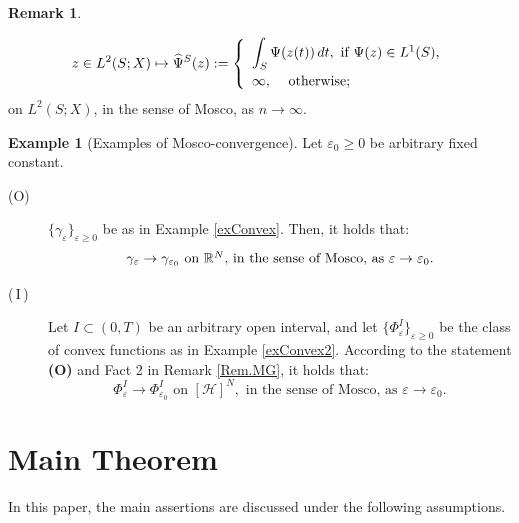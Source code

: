 \documentclass{sinst}
\numberwithin{equation}{section}
\theoremstyle{plain}
\theoremstyle{definition}
\newtheorem{rem}{Remark}
\newtheorem{ex}{Example}
\def\R{\mathbb{R}}
\def\sH{\mathscr{H}}
\def\ds{\displaystyle}
\begin{document}
\begin{rem}
\begin{description}
          \begin{equation*}
              z \in L^2(S; X) \mapsto \widehat{\Psi}^S(z) := \left\{ \begin{array}{ll}
                      \multicolumn{2}{l}{\ds \int_S \Psi(z(t)) \, dt, \mbox{ if $ \Psi(z) \in L^1(S) $,}}
                      \\[2ex]
                      \infty, & \mbox{ otherwise;}
                  \end{array} \right. 
          \end{equation*}
          on $ L^2(S; X) $, in the sense of Mosco, as $ n \to \infty $. 
  \end{description}
  \end{rem}
  
  \begin{ex}[Examples of Mosco-convergence]\label{Rem.ExMG}
      Let $ \varepsilon_0 \geq 0 $ be arbitrary fixed constant.
      \begin{description}
        \item[(O)] $\{ \gamma_\varepsilon \}_{\varepsilon \geq 0}$ be as in Example \ref{exConvex}. Then, it holds that:
      \begin{equation}
        \gamma_\varepsilon \to \gamma_{\varepsilon_0} \mbox{ on $ \R^N $, in the sense of Mosco, as $ \varepsilon \to \varepsilon_0 $.}
      \end{equation}
      \item[(\,I\,)] Let $I \subset (0,T)$ be an arbitrary open interval, and let $\{ \Phi_\varepsilon^I \}_{\varepsilon \geq 0}$ be the class of convex functions as in Example \ref{exConvex2}. According to the statement \textbf{(O)} and Fact 2 in Remark \ref{Rem.MG}, it holds that:
      \begin{equation}
        \Phi_\varepsilon^I \to \Phi_{\varepsilon_0}^I \mbox{ on } [\sH]^N, \mbox{ in the sense of Mosco, as } \varepsilon \to \varepsilon_0.
      \end{equation}
      \end{description}
  \end{ex}

\section{Main Theorem}\label{s:sec2}

In this paper, the main assertions are discussed under the following assumptions.
\end{document}

